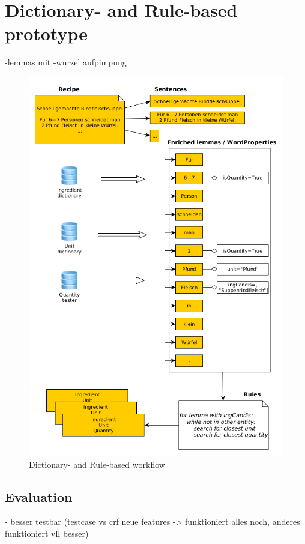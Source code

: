 \documentclass[12pt, twoside]{report}
\begin{document}
\section{Dictionary- and Rule-based prototype}
-lemmas mit -wurzel aufpimpung

\begin{figure}
	\includegraphics[width=1\linewidth]{../Images/dictBasedExtraction}
	\caption{Dictionary- and Rule-based workflow}
	\label{fig:workflowDictbased}
\end{figure}


\subsection{Evaluation}
- besser testbar (testcase vs crf neue features -> funktioniert alles noch, anderes funktioniert vll besser)
\end{document}
